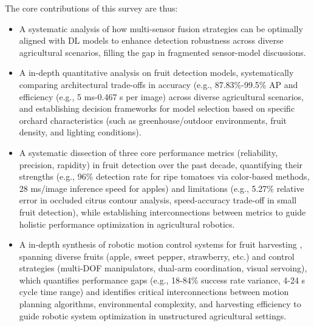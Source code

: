 \documentclass[a4paper,fleqn]{cas-dc}
\begin{document}
The core contributions of this survey are thus:
\begin{itemize}
\item A systematic analysis of how multi-sensor fusion strategies can be optimally aligned with DL models to enhance detection robustness across diverse agricultural scenarios, filling the gap in fragmented sensor-model discussions.
\item  A in-depth quantitative analysis on fruit detection models, systematically comparing architectural trade-offs in accuracy (e.g., 87.83\%-99.5\% AP and efficiency (e.g., 5 ms-0.467 s per image) across diverse agricultural scenarios, and establishing decision frameworks for model selection based on specific orchard characteristics (such as greenhouse/outdoor environments, fruit density, and lighting conditions).
\item A systematic dissection of three core performance metrics (reliability, precision, rapidity) in fruit detection over the past decade, quantifying their strengths (e.g., 96\% detection rate for ripe tomatoes via color-based methods, 28 ms/image inference speed for apples) and limitations (e.g., 5.27\% relative error in occluded citrus contour analysis, speed-accuracy trade-off in small fruit detection), while establishing interconnections between metrics to guide holistic performance optimization in agricultural robotics.
\item A in-depth synthesis of robotic motion control systems for fruit harvesting , spanning diverse fruits (apple, sweet pepper, strawberry, etc.) and control strategies (multi-DOF manipulators, dual-arm coordination, visual servoing), which quantifies performance gaps (e.g., 18-84\% success rate variance, 4-24 s cycle time range) and identifies critical interconnections between motion planning algorithms, environmental complexity, and harvesting efficiency to guide robotic system optimization in unstructured agricultural settings.
\end{itemize}
\fi
\end{document}
